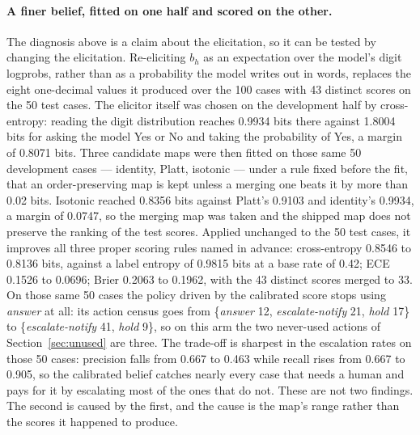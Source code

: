 \documentclass{article}
\begin{document}
\paragraph{A finer belief, fitted on one half and scored on the other.}
The diagnosis above is a claim about the elicitation, so it can be tested by
changing the elicitation. Re-eliciting $b_h$ as an expectation over the model's
digit logprobs, rather than as a probability the model writes out in words,
replaces the eight one-decimal values it produced over the 100 cases with 43
distinct scores on the 50 test cases. The elicitor itself was chosen on the
development half by cross-entropy: reading the digit distribution reaches 0.9934
bits there against 1.8004 bits for asking the model Yes or No and taking the
probability of Yes, a margin of 0.8071 bits. Three candidate maps were then fitted
on those same 50 development cases --- identity, Platt, isotonic --- under a rule
fixed before the fit, that an order-preserving map is kept unless a merging one
beats it by more than 0.02 bits. Isotonic reached 0.8356 bits against Platt's
0.9103 and identity's 0.9934, a margin of 0.0747, so the merging map was taken and
the shipped map does not preserve the ranking of the test scores. Applied unchanged
to the 50 test cases, it improves all three proper scoring rules named in advance:
cross-entropy 0.8546 to 0.8136 bits, against a label entropy of 0.9815 bits at a
base rate of 0.42; ECE 0.1526 to 0.0696; Brier 0.2063 to 0.1962, with the 43
distinct scores merged to 33. On those same 50 cases the policy driven by the
calibrated score stops using \emph{answer} at all: its action census goes from
\{\emph{answer} 12, \emph{escalate-notify} 21, \emph{hold} 17\} to
\{\emph{escalate-notify} 41, \emph{hold} 9\}, so on this arm the two never-used
actions of Section~\ref{sec:unused} are three. The trade-off is sharpest in the
escalation rates on those 50 cases: precision falls from 0.667 to 0.463 while
recall rises from 0.667 to 0.905, so the calibrated belief catches nearly every
case that needs a human and pays for it by escalating most of the ones that do
not. These are not two findings. The
second is caused by the first, and the cause is the map's range rather than the
scores it happened to produce.
\end{document}
